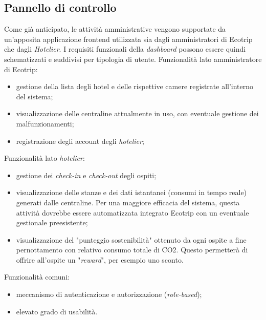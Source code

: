 \subsection{Pannello di controllo}
Come già anticipato, le attività amministrative vengono supportate da un'apposita applicazione frontend utilizzata sia dagli amministratori di Ecotrip che dagli \textit{Hotelier}. 
I requisiti funzionali della \textit{dashboard} possono essere quindi schematizzati e suddivisi per tipologia di utente.\newline\newline
%
Funzionalità lato amministratore di Ecotrip:
\begin{itemize}
    \item gestione della lista degli hotel e delle rispettive camere registrate all'interno del sistema;
    \item visualizzazione delle centraline attualmente in uso, con eventuale gestione dei malfunzionamenti;
    \item registrazione degli account degli \textit{hotelier};
\end{itemize}
%
Funzionalità lato \textit{hotelier}:
\begin{itemize}
    \item gestione dei \textit{check-in} e \textit{check-out} degli ospiti;
    \item visualizzazione delle stanze e dei dati istantanei (consumi in tempo reale) generati dalle centraline. Per una maggiore efficacia del sistema, questa attività dovrebbe essere automatizzata integrato Ecotrip con un eventuale gestionale preesistente;
    \item visualizzazione del "punteggio sostenibilità" ottenuto da ogni ospite a fine pernottamento con relativo consumo totale di CO2. Questo permetterà di offrire all'ospite un "\textit{reward}", per esempio uno sconto. 
\end{itemize}
%
Funzionalità comuni:
\begin{itemize}
    \item meccanismo di autenticazione e autorizzazione (\textit{role-based});
    \item elevato grado di usabilità.
\end{itemize} 
%
